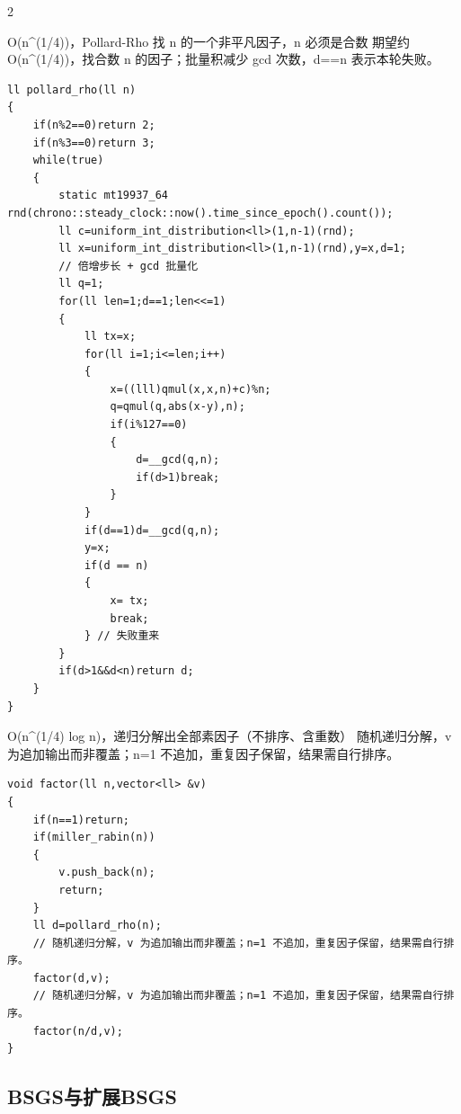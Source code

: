 \documentclass[UTF8,fontset=fandol,a4paper,twoside]{ctexart}
\newcommand{\note}[1]{{\fontsize{10}{12}\selectfont #1\par}}
\begin{document}
\begin{multicols}{2}
\note{O(\allowbreak{}n\textasciicircum{}(\allowbreak{}1/\allowbreak{}4)\allowbreak{})\allowbreak{}，Pollard-\allowbreak{}Rho 找 n 的一个非平凡因子，n 必须是合数 期望约 O(\allowbreak{}n\textasciicircum{}(\allowbreak{}1/\allowbreak{}4)\allowbreak{})\allowbreak{}，找合数 n 的因子；批量积减少 gcd 次数，d=\allowbreak{}=\allowbreak{}n 表示本轮失败。}
\begin{lstlisting}
ll pollard_rho(ll n)
{
    if(n%2==0)return 2;
    if(n%3==0)return 3;
    while(true)
    {
        static mt19937_64 rnd(chrono::steady_clock::now().time_since_epoch().count());
        ll c=uniform_int_distribution<ll>(1,n-1)(rnd);
        ll x=uniform_int_distribution<ll>(1,n-1)(rnd),y=x,d=1;
        // 倍增步长 + gcd 批量化
        ll q=1;
        for(ll len=1;d==1;len<<=1)
        {
            ll tx=x;
            for(ll i=1;i<=len;i++)
            {
                x=((lll)qmul(x,x,n)+c)%n;
                q=qmul(q,abs(x-y),n);
                if(i%127==0)
                {
                    d=__gcd(q,n);
                    if(d>1)break;
                }
            }
            if(d==1)d=__gcd(q,n);
            y=x;
            if(d == n)
            {
                x= tx;
                break;
            } // 失败重来
        }
        if(d>1&&d<n)return d;
    }
}
\end{lstlisting}
\note{O(\allowbreak{}n\textasciicircum{}(\allowbreak{}1/\allowbreak{}4)\allowbreak{} log n)\allowbreak{}，递归分解出全部素因子（不排序、含重数） 随机递归分解，v 为追加输出而非覆盖；n=\allowbreak{}1 不追加，重复因子保留，结果需自行排序。}
\begin{lstlisting}
void factor(ll n,vector<ll> &v)
{
    if(n==1)return;
    if(miller_rabin(n))
    {
        v.push_back(n);
        return;
    }
    ll d=pollard_rho(n);
    // 随机递归分解，v 为追加输出而非覆盖；n=1 不追加，重复因子保留，结果需自行排序。
    factor(d,v);
    // 随机递归分解，v 为追加输出而非覆盖；n=1 不追加，重复因子保留，结果需自行排序。
    factor(n/d,v);
}
\end{lstlisting}
\subsection{BSGS与扩展BSGS}


\end{multicols}
\end{document}
